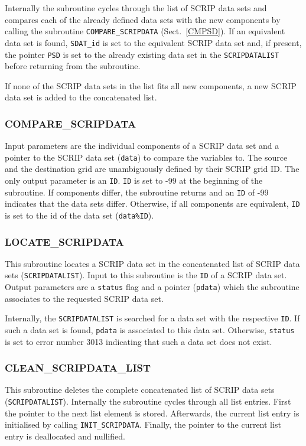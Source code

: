 \documentclass[11pt,twoside]{article}
\begin{document}
Internally the subroutine cycles through the list of SCRIP data sets
and compares each of the already defined data sets with the new
components  by calling the subroutine \verb|COMPARE_SCRIPDATA|
(Sect.~\ref{CMPSD}). If an equivalent data set is
found, \verb|SDAT_id| is set to the equivalent SCRIP data set and, if
present, the pointer \verb|PSD| is set to the already existing data
set in the \verb|SCRIPDATALIST| before returning from the subroutine.

If none of the SCRIP data sets in the list fits all new components,
a new SCRIP data set is added to the concatenated list.


\subsubsection{COMPARE\_SCRIPDATA\label{CMPSD}}
Input parameters are the individual components of a SCRIP data set and a
 pointer to the SCRIP data set (\verb|data|) 
to compare the variables to. The source and the
 destination grid are unambiguously defined by their SCRIP grid ID.
The only output parameter is an \verb|ID|. \verb|ID| is set to -99 at
 the beginning of the subroutine. If components differ, the subroutine
 returns and an \verb|ID| of -99 indicates that the data sets differ.
Otherwise, if all components are equivalent, \verb|ID| is set to the
 id of the data set (\verb|data%ID|).

\subsubsection{LOCATE\_SCRIPDATA\label{LOCSD}}
This subroutine locates a SCRIP data set in the concatenated list of
SCRIP data sets (\verb|SCRIPDATALIST|).
Input to this subroutine is the \verb|ID| of a SCRIP data set. Output
parameters are a \verb|status| flag and a pointer (\verb|pdata|) which
the subroutine associates to the requested SCRIP data set.

Internally, the \verb|SCRIPDATALIST| is searched for a data set with
the respective \verb|ID|. If such a data set is found, \verb|pdata| is
associated to this data set. Otherwise, \verb|status| is set to error
number 3013 indicating that such a data set does not exist.

\subsubsection{CLEAN\_SCRIPDATA\_LIST\label{CLEANSDL}}
This subroutine deletes the complete concatenated list of
SCRIP data sets (\verb|SCRIPDATALIST|).
Internally the subroutine cycles through all list entries. First the
pointer to the next list element is stored. Afterwards, 
 the current list entry is initialised by
 calling \verb|INIT_SCRIPDATA|. Finally, the pointer to the current
 list entry is deallocated and nullified. 
\end{document}
